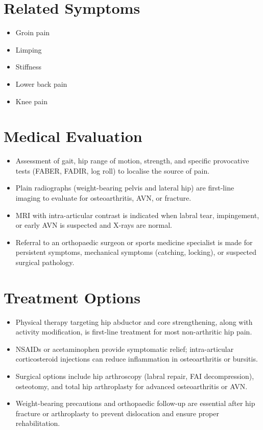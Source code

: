\section*{Related Symptoms}
\begin{itemize}
  \item Groin pain
  \item Limping
  \item Stiffness
  \item Lower back pain
  \item Knee pain
\end{itemize}

\section*{Medical Evaluation}
\begin{itemize}
  \item Assessment of gait, hip range of motion, strength, and specific provocative tests (FABER, FADIR, log roll) to localise the source of pain.
  \item Plain radiographs (weight-bearing pelvis and lateral hip) are first-line imaging to evaluate for osteoarthritis, AVN, or fracture.
  \item MRI with intra-articular contrast is indicated when labral tear, impingement, or early AVN is suspected and X-rays are normal.
  \item Referral to an orthopaedic surgeon or sports medicine specialist is made for persistent symptoms, mechanical symptoms (catching, locking), or suspected surgical pathology.
\end{itemize}

\section*{Treatment Options}
\begin{itemize}
  \item Physical therapy targeting hip abductor and core strengthening, along with activity modification, is first-line treatment for most non-arthritic hip pain.
  \item NSAIDs or acetaminophen provide symptomatic relief; intra-articular corticosteroid injections can reduce inflammation in osteoarthritis or bursitis.
  \item Surgical options include hip arthroscopy (labral repair, FAI decompression), osteotomy, and total hip arthroplasty for advanced osteoarthritis or AVN.
  \item Weight-bearing precautions and orthopaedic follow-up are essential after hip fracture or arthroplasty to prevent dislocation and ensure proper rehabilitation.
\end{itemize}

